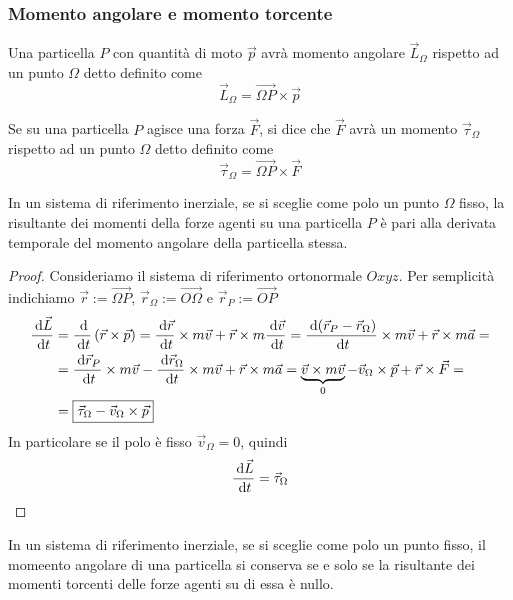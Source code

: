 \documentclass{article}
\theoremstyle{plain}
\begin{document}
\subsubsection{Momento angolare e momento torcente}
\begin{boxdef}
     Una particella $P$ con quantità di moto $\vec p$ avrà momento angolare $\vec L_\Omega$ rispetto ad un punto $\Omega$ detto  definito come
     \[\vec L_{\Omega} = \overrightarrow{\Omega P}\times \vec p\]
\end{boxdef}

\begin{boxdef}
    Se su una particella $P$ agisce una forza $\vec F$, si dice che $\vec F$ avrà un momento $\vec \tau_\Omega$ rispetto ad un punto $\Omega$ detto  definito come
    \[\vec \tau_{\Omega} = \overrightarrow{\Omega P}\times \vec F\]
\end{boxdef}
\begin{shadedTheorem}
    In un sistema di riferimento inerziale, se si sceglie come polo un punto $\Omega$ fisso, la risultante dei momenti della forze agenti su una particella $P$ è pari alla derivata temporale del momento angolare della particella stessa.
\end{shadedTheorem}
\begin{proof}
    Consideriamo il sistema di riferimento ortonormale $Oxyz$. Per semplicità indichiamo $\vec r:= \overrightarrow{\Omega P}$, $\vec r_{\Omega}:= \overrightarrow{O\Omega}$ e $\vec r_{P}:= \overrightarrow{OP}$
    \[
    \begin{aligned}
        \frac{\:\text{d} \vec L}{\:\text{d} t} &= \frac{\:\text{d}}{\:\text{d} t}\left( \vec r\times \vec p \right) = \frac{\:\text{d} \vec r}{\:\text{d} t} \times m \vec v + \vec r \times m\frac{\:\text{d} \vec v}{\:\text{d} t} = \frac{\:\text{d} (\vec r_P -\vec r_\Omega)}{\:\text{d} t} \times m \vec v + \vec r \times m\vec a = \\& = \frac{\:\text{d}\vec r_P}{\:\text{d} t} \times m \vec v - \frac{\:\text{d} \vec r_\Omega}{\:\text{d} t} \times m \vec v + \vec r \times m\vec a = \underbrace{\vec v \times m\vec v}_0 - \vec v_\Omega \times \vec p +\vec r \times \vec F = \\ &=\boxed{\vec \tau_{\Omega} - \vec v_\Omega \times \vec p}
    \end{aligned}\]
    In particolare se il polo è fisso $\vec v_\Omega=0$, quindi \[\frac{\:\text{d} \vec L}{\:\text{d} t} = \vec \tau_{\Omega}\]
\end{proof}
\begin{corollary*}
    In un sistema di riferimento inerziale, se si sceglie come polo un punto fisso, il momeento angolare di una particella si conserva se e solo se la risultante dei momenti torcenti delle forze agenti su di essa è nullo.
\end{corollary*}
\end{document}
